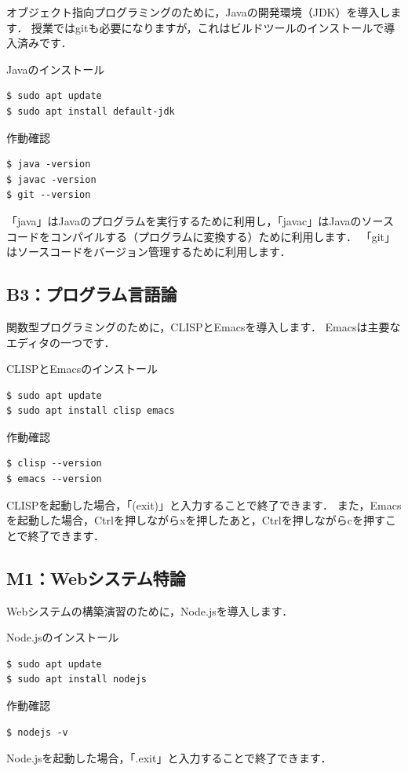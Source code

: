 \documentclass[dvipdfmx]{jarticle}
\begin{document}
オブジェクト指向プログラミングのために，Javaの開発環境（JDK）を導入します．
授業ではgitも必要になりますが，これはビルドツールのインストールで導入済みです．

\begin{itembox}[l]{Javaのインストール}
\begin{verbatim}
$ sudo apt update
$ sudo apt install default-jdk
\end{verbatim}
\end{itembox}

\begin{itembox}[l]{作動確認}
\begin{verbatim}
$ java -version
$ javac -version
$ git --version
\end{verbatim}
\end{itembox}

「java」はJavaのプログラムを実行するために利用し，「javac」はJavaのソースコードをコンパイルする（プログラムに変換する）ために利用します．
「git」はソースコードをバージョン管理するために利用します．

\subsection{B3：プログラム言語論}

関数型プログラミングのために，CLISPとEmacsを導入します．
Emacsは主要なエディタの一つです．

\begin{itembox}[l]{CLISPとEmacsのインストール}
\begin{verbatim}
$ sudo apt update
$ sudo apt install clisp emacs
\end{verbatim}
\end{itembox}

\begin{itembox}[l]{作動確認}
\begin{verbatim}
$ clisp --version
$ emacs --version
\end{verbatim}
\end{itembox}

CLISPを起動した場合，「(exit)」と入力することで終了できます．
また，Emacsを起動した場合，Ctrlを押しながらxを押したあと，Ctrlを押しながらcを押すことで終了できます．

\subsection{M1：Webシステム特論}

Webシステムの構築演習のために，Node.jsを導入します．

\begin{itembox}[l]{Node.jsのインストール}
\begin{verbatim}
$ sudo apt update
$ sudo apt install nodejs
\end{verbatim}
\end{itembox}

\begin{itembox}[l]{作動確認}
\begin{verbatim}
$ nodejs -v
\end{verbatim}
\end{itembox}

Node.jsを起動した場合，「.exit」と入力することで終了できます．
\end{document}

